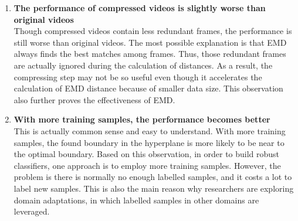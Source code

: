 \begin{enumerate}
  \item{\bf The performance of compressed videos is slightly worse than original videos} \\
  Though compressed videos contain less redundant frames, the performance is still worse than original videos. The most possible explanation is that EMD always finds the best matches among frames. Thus, those redundant frames are actually ignored during the calculation of distances. As a result, the compressing step may not be so useful even though it accelerates the calculation of EMD distance because of smaller data size. This observation also further proves the effectiveness of EMD.

  \item{\bf With more training samples, the performance becomes better} \\
  This is actually common sense and easy to understand. With more training samples, the found boundary in the hyperplane is more likely to be near to the optimal boundary. Based on this observation, in order to build robust classifiers, one approach is to employ more training samples. However, the problem is there is normally no enough labelled samples, and it costs a lot to label new samples. This is also the main reason why researchers are exploring domain adaptations, in which labelled samples in other domains are leveraged. 
\end{enumerate}

